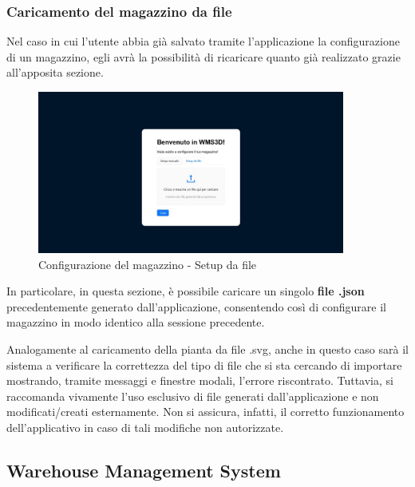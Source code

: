         \subsubsection{Caricamento del magazzino da file}\label{sec:creazione:caricamento}
            Nel caso in cui l'utente abbia già salvato tramite l'applicazione la configurazione di un magazzino, egli avrà la possibilità di ricaricare quanto già realizzato grazie all'apposita sezione. 
            \begin{figure}[H]
                \centering
                \includegraphics[width=0.9\textwidth]{images/caricamento.png}
                \caption{Configurazione del magazzino - Setup da file}
            \end{figure}
           \noindent In particolare, in questa sezione, è possibile caricare un singolo \textbf{file .json} precedentemente generato dall'applicazione, consentendo così di configurare il magazzino in modo identico alla sessione precedente.
           
           Analogamente al caricamento della pianta da file .svg, anche in questo caso sarà il sistema a verificare la correttezza del tipo di file che si sta cercando di importare mostrando, tramite messaggi e finestre modali, l'errore riscontrato. Tuttavia, si raccomanda vivamente l'uso esclusivo di file generati dall'applicazione e non modificati/creati esternamente. Non si assicura, infatti, il corretto funzionamento dell'applicativo in caso di tali modifiche non autorizzate.
    \newpage        

    \subsection{Warehouse Management System}\label{sec:principale}
